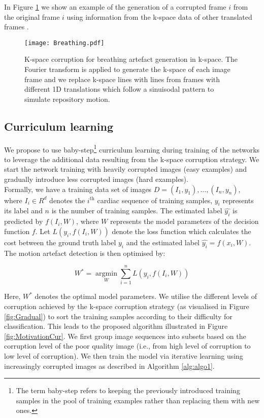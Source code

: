 \documentclass[preprint,12pt,authoryear]{elsarticle}
\begin{document}
In Figure \ref{fig:Kspacebreathing} we show an example of the generation of a corrupted frame $i$ from the original frame $i$ using information from the k-space data of other translated frames \citep{Cruz2016}.


 \begin{figure}[tb]
  \centering
  \centerline{\texttt{[image: Breathing.pdf]}}
\caption{K-space corruption for breathing artefact generation in k-space. The Fourier transform is applied to generate the k-space of each image frame and we replace k-space lines with lines from frames with different 1D translations which follow a sinuisodal pattern to simulate repository motion. }
\label{fig:Kspacebreathing}
\end{figure}



\subsection{Curriculum learning}
\label{sec:curriculum}

We propose to use baby-step\footnote{The term baby-step refers to keeping the previously introduced training samples in the pool of training examples rather than replacing them with new ones.} curriculum learning during training of the networks to leverage the additional data resulting from the k-space corruption strategy. We start the network training with heavily corrupted images (easy examples) and gradually introduce less corrupted images (hard examples). \\

Formally, we have a training data set of images $D={(I_{1},y_{1}), \dots, (I_{n},y_{n})} $, where $I_{i} \in R^{d}$ denotes the $i^{\text{th}}$ cardiac sequence of training samples, $y_{i}$ represents its label and $n$ is the number of training samples. The estimated label $\hat{y_{i}}$  is predicted by $f(I_{i},W)$, where $W$ represents the model parameters of the decision function $f$. Let $L(y_{i}, f(I_{i}, W))$ denote the loss function which calculates the cost between the ground truth label $y_{i}$ and the estimated label $\hat{y_{i}}=f(x_{i},W)$. The motion artefact detection is then optimised by:

$$ W^{*}= \underset{W}{\operatorname{argmin}} \sum_{i=1}^n L(y_{i}, f(I_{i}, W)) $$

Here, $W^{*}$ denotes the optimal model parameters. We utilise the different levels of corruption achieved by the k-space corruption strategy (as visualised in Figure \ref{fig:Gradual}) to sort the training samples according to their difficulty for classification.  This leads to the proposed algorithm illustrated in Figure \ref{fig:MotivationCur}. We first group image sequences into subsets based on the corruption level of the poor quality image (i.e., from high level of corruption to low level of corruption). We then train the model via iterative learning using increasingly corrupted images as described in Algorithm \ref{alg:algo1}.
\end{document}
